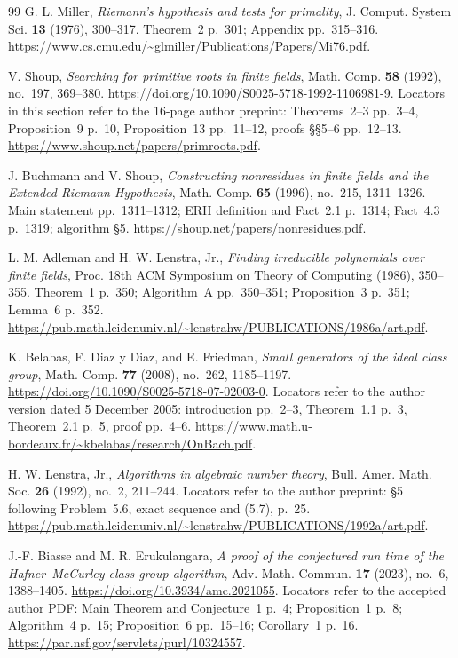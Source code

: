 \documentclass[11pt,a4paper]{article}
\begin{document}
\begin{thebibliography}{99}
G. L. Miller, \emph{Riemann's hypothesis and tests for primality},
J. Comput. System Sci. \textbf{13} (1976), 300--317.
Theorem~2 p.~301; Appendix pp.~315--316.
\url{https://www.cs.cmu.edu/~glmiller/Publications/Papers/Mi76.pdf}.



V. Shoup, \emph{Searching for primitive roots in finite fields},
Math. Comp. \textbf{58} (1992), no.~197, 369--380.
\url{https://doi.org/10.1090/S0025-5718-1992-1106981-9}.
Locators in this section refer to the 16-page author preprint:
Theorems~2--3 pp.~3--4, Proposition~9 p.~10, Proposition~13 pp.~11--12,
proofs \S\S5--6 pp.~12--13.
\url{https://www.shoup.net/papers/primroots.pdf}.



J. Buchmann and V. Shoup,
\emph{Constructing nonresidues in finite fields and the Extended Riemann Hypothesis},
Math. Comp. \textbf{65} (1996), no.~215, 1311--1326.
Main statement pp.~1311--1312; ERH definition and Fact~2.1 p.~1314;
Fact~4.3 p.~1319; algorithm \S5.
\url{https://shoup.net/papers/nonresidues.pdf}.



L. M. Adleman and H. W. Lenstra, Jr.,
\emph{Finding irreducible polynomials over finite fields},
Proc. 18th ACM Symposium on Theory of Computing (1986), 350--355.
Theorem~1 p.~350; Algorithm~A pp.~350--351; Proposition~3 p.~351;
Lemma~6 p.~352.
\url{https://pub.math.leidenuniv.nl/~lenstrahw/PUBLICATIONS/1986a/art.pdf}.



K. Belabas, F. Diaz y Diaz, and E. Friedman,
\emph{Small generators of the ideal class group},
Math. Comp. \textbf{77} (2008), no.~262, 1185--1197.
\url{https://doi.org/10.1090/S0025-5718-07-02003-0}.
Locators refer to the author version dated 5 December 2005:
introduction pp.~2--3, Theorem~1.1 p.~3, Theorem~2.1 p.~5,
proof pp.~4--6.
\url{https://www.math.u-bordeaux.fr/~kbelabas/research/OnBach.pdf}.



H. W. Lenstra, Jr., \emph{Algorithms in algebraic number theory},
Bull. Amer. Math. Soc. \textbf{26} (1992), no.~2, 211--244.
Locators refer to the author preprint:
\S5 following Problem~5.6, exact sequence and (5.7), p.~25.
\url{https://pub.math.leidenuniv.nl/~lenstrahw/PUBLICATIONS/1992a/art.pdf}.



J.-F. Biasse and M. R. Erukulangara,
\emph{A proof of the conjectured run time of the Hafner--McCurley class group algorithm},
Adv. Math. Commun. \textbf{17} (2023), no.~6, 1388--1405.
\url{https://doi.org/10.3934/amc.2021055}.
Locators refer to the accepted author PDF: Main Theorem and Conjecture~1 p.~4;
Proposition~1 p.~8; Algorithm~4 p.~15; Proposition~6 pp.~15--16;
Corollary~1 p.~16.
\url{https://par.nsf.gov/servlets/purl/10324557}.




\end{thebibliography}
\end{document}
